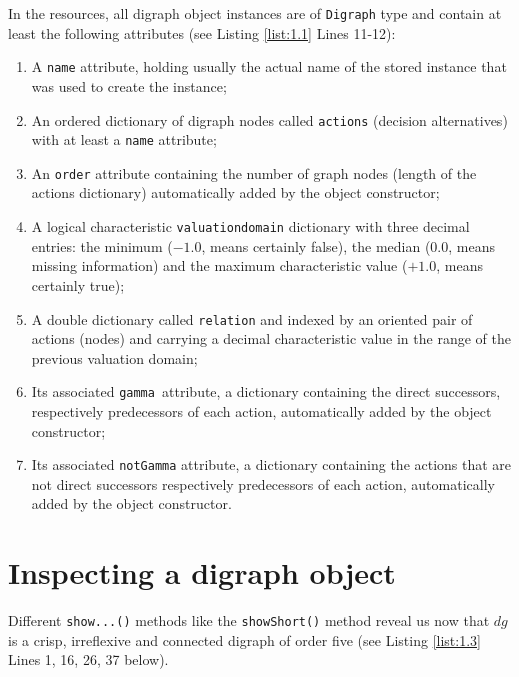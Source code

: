 In the \Digraph resources, all digraph object instances are of \texttt{Digraph} type and contain at least the following attributes (see Listing \ref{list:1.1}  Lines 11-12):
\begin{enumerate}[leftmargin=0.5cm,listparindent=0em]
\item A \texttt{name} attribute, holding usually the actual name of the stored instance that was used to create the instance;
\item An ordered dictionary of digraph nodes called \texttt{actions} (decision alternatives) with at least a \texttt{name} attribute;
\item An \texttt{order} attribute containing the number of graph nodes (length of the actions dictionary) automatically added by the object constructor;
\item  A logical characteristic \texttt{valuationdomain} dictionary with three decimal entries: the minimum ($-1.0$, means certainly false), the median ($0.0$, means missing information) and the maximum characteristic value ($+1.0$, means certainly true);
\item A double dictionary called \texttt{relation} and indexed by an oriented pair of actions (nodes) and carrying a decimal characteristic value in the range of the previous valuation domain;
\item Its associated \texttt{gamma }attribute, a dictionary containing the direct successors, respectively predecessors of each action, automatically added by the object constructor;
\item Its associated \texttt{notGamma} attribute, a dictionary containing the actions that are not direct successors respectively predecessors of each action, automatically added by the object constructor.
\end{enumerate}

\section{Inspecting a digraph object}
\label{sec:1.4}

Different \texttt{show...()} methods like the \texttt{showShort()} method  reveal us now that $dg$ is a crisp, irreflexive and connected digraph of order five (see Listing \ref{list:1.3}  Lines 1, 16, 26, 37 below).

